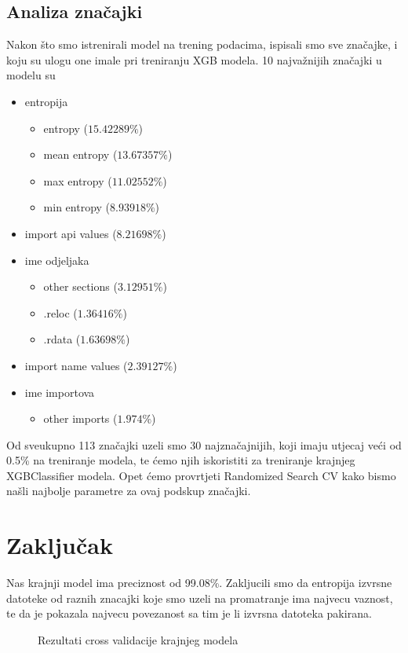 \documentclass[conference]{IEEEtran}
\begin{document}
\subsection{Analiza značajki}
Nakon što smo istrenirali model na trening podacima, ispisali smo sve značajke, i koju su ulogu one imale pri treniranju XGB modela. 10 najvažnijih značajki u modelu su
\begin{itemize}
\item entropija
	\begin{itemize}
	\item entropy ($15.42289\%$)
	\item mean entropy ($13.67357\%$)
	\item max entropy ($11.02552\%$)
	\item min entropy ($8.93918\%$)
	\end{itemize}
\item import api values ($8.21698\%$)
\item ime odjeljaka
	\begin{itemize}
	\item other sections ($3.12951\%$)
	\item .reloc ($1.36416\%$)
	\item .rdata ($1.63698\%$)
	\end{itemize}
\item import name values ($2.39127\%$)
\item ime importova
	\begin{itemize}
	\item other imports ($1.974\%$)
	\end{itemize}
\end{itemize}
Od sveukupno 113 značajki uzeli smo 30 najznačajnijih, koji imaju utjecaj veći od 0.5\% na treniranje modela, te ćemo njih iskoristiti za treniranje krajnjeg XGBClassifier modela. Opet ćemo provrtjeti Randomized Search CV kako bismo našli najbolje parametre za ovaj podskup značajki.
\begin{figure}[h]
\end{figure}
\section{Zaključak}
Nas krajnji model ima preciznost od 99.08\%. Zakljucili smo da entropija izvrsne datoteke od raznih znacajki koje smo uzeli na promatranje ima najvecu vaznost, te da je pokazala najvecu povezanost sa tim je li izvrsna datoteka pakirana.
\begin{figure}
\caption{Rezultati cross validacije krajnjeg modela}
\end{figure}
\newpage
\end{document}
